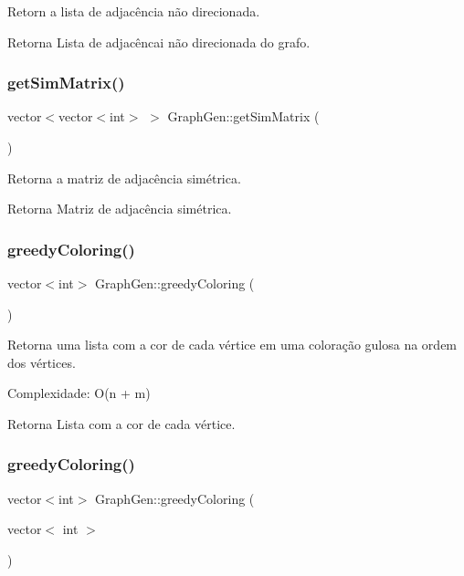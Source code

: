 Retorn a lista de adjacência não direcionada. \begin{DoxyReturn}{Retorna}
Lista de adjacêncai não direcionada do grafo. 
\end{DoxyReturn}
\mbox{\label{classGraphGen_ab2f8872fc9fab4268ad999dd89e1d4fa}} 
\subsubsection{\texorpdfstring{getSimMatrix()}{getSimMatrix()}}
{\footnotesize\ttfamily vector$<$vector$<$int$>$ $>$ Graph\+Gen\+::get\+Sim\+Matrix (\begin{DoxyParamCaption}{ }\end{DoxyParamCaption})}

Retorna a matriz de adjacência simétrica. \begin{DoxyReturn}{Retorna}
Matriz de adjacência simétrica. 
\end{DoxyReturn}
\mbox{\label{classGraphGen_a8505ba4cbaa0685f43e52a4c4f296dc1}} 
\subsubsection{\texorpdfstring{greedyColoring()}{greedyColoring()}\hspace{0.1cm}{\footnotesize\ttfamily [1/2]}}
{\footnotesize\ttfamily vector$<$int$>$ Graph\+Gen\+::greedy\+Coloring (\begin{DoxyParamCaption}{ }\end{DoxyParamCaption})}

Retorna uma lista com a cor de cada vértice em uma coloração gulosa na ordem dos vértices.

Complexidade\+: O(n + m) \begin{DoxyReturn}{Retorna}
Lista com a cor de cada vértice. 
\end{DoxyReturn}
\mbox{\label{classGraphGen_a0690c98ce5c9dd544074f690fb79a8c6}} 
\subsubsection{\texorpdfstring{greedyColoring()}{greedyColoring()}\hspace{0.1cm}{\footnotesize\ttfamily [2/2]}}
{\footnotesize\ttfamily vector$<$int$>$ Graph\+Gen\+::greedy\+Coloring (\begin{DoxyParamCaption}\item[{vector$<$ int $>$}]{ }\end{DoxyParamCaption})}

